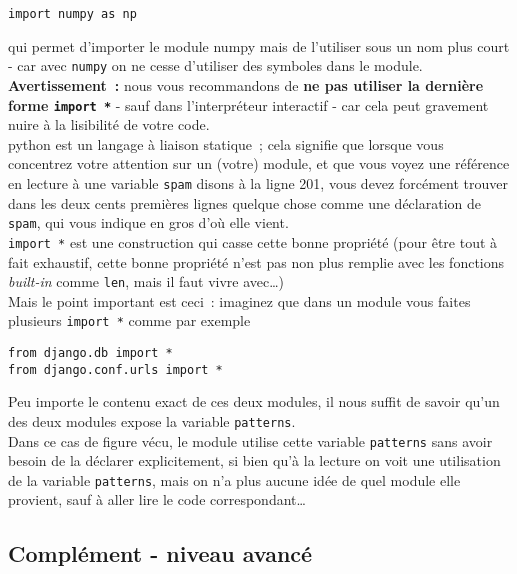 \begin{verbatim}
import numpy as np
\end{verbatim}

qui permet d'importer le module numpy mais de l'utiliser sous un nom
plus court - car avec \texttt{numpy} on ne cesse d'utiliser des symboles
dans le module.\\

    \textbf{Avertissement~:} nous vous recommandons de \textbf{ne pas
utiliser la dernière forme \texttt{import\ *}} - sauf dans
l'interpréteur interactif - car cela peut gravement nuire à la
lisibilité de votre code.\\

    python est un langage à liaison statique~; cela signifie que lorsque
vous concentrez votre attention sur un (votre) module, et que vous voyez
une référence en lecture à une variable \texttt{spam} disons à la ligne
201, vous devez forcément trouver dans les deux cents premières lignes
quelque chose comme une déclaration de \texttt{spam}, qui vous indique
en gros d'où elle vient.\\

\texttt{import\ *} est une construction qui casse cette bonne propriété
(pour être tout à fait exhaustif, cette bonne propriété n'est pas non
plus remplie avec les fonctions \emph{built-in} comme \texttt{len}, mais
il faut vivre avec\ldots{})\\

Mais le point important est ceci~: imaginez que dans un module vous
faites plusieurs \texttt{import\ *} comme par exemple

\begin{verbatim}
from django.db import *
from django.conf.urls import *
\end{verbatim}

Peu importe le contenu exact de ces deux modules, il nous suffit de
savoir qu'un des deux modules expose la variable \texttt{patterns}.\\

Dans ce cas de figure vécu, le module utilise cette variable
\texttt{patterns} sans avoir besoin de la déclarer explicitement, si
bien qu'à la lecture on voit une utilisation de la variable
\texttt{patterns}, mais on n'a plus aucune idée de quel module elle
provient, sauf à aller lire le code correspondant\ldots{}

    \hypertarget{compluxe9ment---niveau-avancuxe9}{%
\subsection{Complément - niveau
avancé}\label{compluxe9ment---niveau-avancuxe9}}

